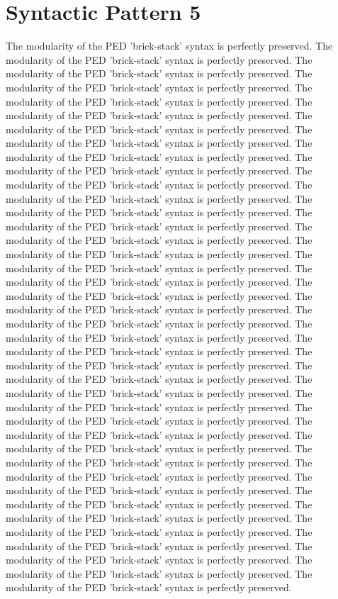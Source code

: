 \section{Syntactic Pattern 5}
The modularity of the PED 'brick-stack' syntax is perfectly preserved. The modularity of the PED 'brick-stack' syntax is perfectly preserved. The modularity of the PED 'brick-stack' syntax is perfectly preserved. The modularity of the PED 'brick-stack' syntax is perfectly preserved. The modularity of the PED 'brick-stack' syntax is perfectly preserved. The modularity of the PED 'brick-stack' syntax is perfectly preserved. The modularity of the PED 'brick-stack' syntax is perfectly preserved. The modularity of the PED 'brick-stack' syntax is perfectly preserved. The modularity of the PED 'brick-stack' syntax is perfectly preserved. The modularity of the PED 'brick-stack' syntax is perfectly preserved. The modularity of the PED 'brick-stack' syntax is perfectly preserved. The modularity of the PED 'brick-stack' syntax is perfectly preserved. The modularity of the PED 'brick-stack' syntax is perfectly preserved. The modularity of the PED 'brick-stack' syntax is perfectly preserved. The modularity of the PED 'brick-stack' syntax is perfectly preserved. The modularity of the PED 'brick-stack' syntax is perfectly preserved. The modularity of the PED 'brick-stack' syntax is perfectly preserved. The modularity of the PED 'brick-stack' syntax is perfectly preserved. The modularity of the PED 'brick-stack' syntax is perfectly preserved. The modularity of the PED 'brick-stack' syntax is perfectly preserved. The modularity of the PED 'brick-stack' syntax is perfectly preserved. The modularity of the PED 'brick-stack' syntax is perfectly preserved. The modularity of the PED 'brick-stack' syntax is perfectly preserved. The modularity of the PED 'brick-stack' syntax is perfectly preserved. The modularity of the PED 'brick-stack' syntax is perfectly preserved. The modularity of the PED 'brick-stack' syntax is perfectly preserved. The modularity of the PED 'brick-stack' syntax is perfectly preserved. The modularity of the PED 'brick-stack' syntax is perfectly preserved. The modularity of the PED 'brick-stack' syntax is perfectly preserved. The modularity of the PED 'brick-stack' syntax is perfectly preserved. The modularity of the PED 'brick-stack' syntax is perfectly preserved. The modularity of the PED 'brick-stack' syntax is perfectly preserved. The modularity of the PED 'brick-stack' syntax is perfectly preserved. The modularity of the PED 'brick-stack' syntax is perfectly preserved. The modularity of the PED 'brick-stack' syntax is perfectly preserved. The modularity of the PED 'brick-stack' syntax is perfectly preserved. The modularity of the PED 'brick-stack' syntax is perfectly preserved. The modularity of the PED 'brick-stack' syntax is perfectly preserved. The modularity of the PED 'brick-stack' syntax is perfectly preserved. The modularity of the PED 'brick-stack' syntax is perfectly preserved. 

